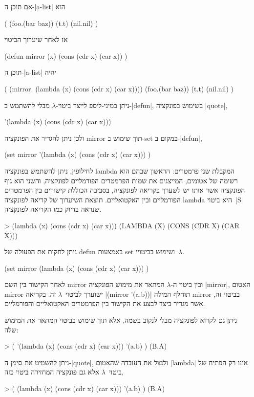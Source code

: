 אם תוכן ה-\E|a-list| הוא
\begin{LISP}
(
  (foo.(bar baz))
  (t.t)
  (nil.nil)
)
\end{LISP}
אז לאחר שיערוך הביטוי
\begin{LISP}
(defun mirror (x)
  (cons (cdr x) (car x))
)
\end{LISP}
תוכן ה-\E|a-list| יהיה
\begin{LISP}
(
  (mirror.
     (lambda (x)
        (cons (cdr x) (car x))))
  (foo.(bar baz))
  (t.t)
  (nil.nil)
)
\end{LISP}

ניתן במיני-ליספ לייצר ביטוי-$λ$ מבלי להשתמש ב-\E|defun|, בשימוש בפונקציה
\E|quote|,
\begin{LISP}
  '(lambda (x) (cons (cdr x) (car x)))
\end{LISP}
ולכן ניתן להגדיר את הפונקציה mirror תוך שימוש ב-set במקום ב-\E|defun|,
\begin{LISP}
(set mirror
  '(lambda (x)
      (cons (cdr x) (car x)))
)
\end{LISP}
לחילופין, ניתן להשתמש בפונקציה lambda המקבלת שני פרמטרים: הראשון שבהם הוא רשימה
של אטומים, המייצגים את שמות הפרמטרים הפורמליים לפונקציה, והשני הוא גוף הפונקציה
אשר אותו יש לשערך בקריאה לפונקציה, בסביבה הכוללת קישורים בין הפרמטרים הפורמליים
ובין האקטואליים. תוצאת השיערוך של קריאה לפונקציה lambda היא ביטוי~\E|S| שנראה
בדיוק כמו הקריאה לפונקציה.
\begin{LISP}
> (lambda (x) (cons (cdr x) (car x)))
(LAMBDA (X) (CONS (CDR X) (CAR X)))
\end{LISP}
ניתן לחקות את הפעולה של defun באמצעות set ושימוש בביטויי~$λ$.
\begin{LISP}
(set
  mirror
  (lambda (x) (cons (cdr x) (car x)))
)
\end{LISP}
לאחר הקישור בין השם mirror ובין ביטוי ה-$λ$ המתאר את מימוש הפונקציה \E|mirror|,
האטום mirror ישוערך לביטוי~$λ$ זה. בקריאה \T|(mirror '(a.b))| תוחלף המילה
mirror בביטוי זה, אשר מגדיר כיצד לבצע את הקישור בין הפרמטרים האקטואליים
והפורמליים.

ניתן גם לקרוא לפונקציה מבלי לנקוב בשמה, אלא תוך שימוש בביטוי המתאר את המימוש
שלה:
\pagebreak[3]
\begin{LISP}
> (
    '(lambda (x)
      (cons (cdr x) (car x)))
    '(a.b)
)
(B.A)
\end{LISP}
ניתן להשמיט את סימן ה-\E|quote|, ולנצל את העובדה שהאטום \T|lambda| אינו רק
הפתיח של ביטוי~$λ$ אלא גם פונקציה המחזירה ביטוי כזה,
\begin{LISP}
> (
    (lambda (x) (cons (cdr x) (car x)))
    '(a.b)
)
(B.A)
\end{LISP}

